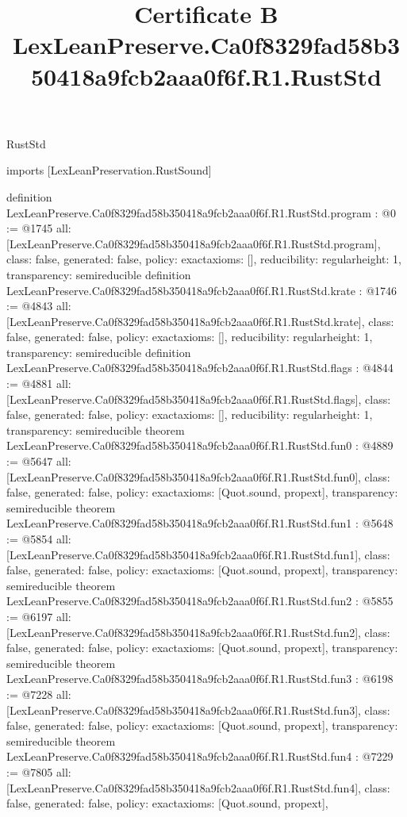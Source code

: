 \begin{lexlean}{RustStd}
\title{Certificate B LexLeanPreserve.Ca0f8329fad58b350418a9fcb2aaa0f6f.R1.RustStd}
\begin{coremodule}
imports [LexLeanPreservation.RustSound]

definition LexLeanPreserve.Ca0f8329fad58b350418a9fcb2aaa0f6f.R1.RustStd.program : @0 := @1745 {
  all: [LexLeanPreserve.Ca0f8329fad58b350418a9fcb2aaa0f6f.R1.RustStd.program],
  class: false,
  generated: false,
  policy: exact{axioms: []},
  reducibility: regular{height: 1},
  transparency: semireducible
}
definition LexLeanPreserve.Ca0f8329fad58b350418a9fcb2aaa0f6f.R1.RustStd.krate : @1746 := @4843 {
  all: [LexLeanPreserve.Ca0f8329fad58b350418a9fcb2aaa0f6f.R1.RustStd.krate],
  class: false,
  generated: false,
  policy: exact{axioms: []},
  reducibility: regular{height: 1},
  transparency: semireducible
}
definition LexLeanPreserve.Ca0f8329fad58b350418a9fcb2aaa0f6f.R1.RustStd.flags : @4844 := @4881 {
  all: [LexLeanPreserve.Ca0f8329fad58b350418a9fcb2aaa0f6f.R1.RustStd.flags],
  class: false,
  generated: false,
  policy: exact{axioms: []},
  reducibility: regular{height: 1},
  transparency: semireducible
}
theorem LexLeanPreserve.Ca0f8329fad58b350418a9fcb2aaa0f6f.R1.RustStd.fun0 : @4889 := @5647 {
  all: [LexLeanPreserve.Ca0f8329fad58b350418a9fcb2aaa0f6f.R1.RustStd.fun0],
  class: false,
  generated: false,
  policy: exact{axioms: [Quot.sound, propext]},
  transparency: semireducible
}
theorem LexLeanPreserve.Ca0f8329fad58b350418a9fcb2aaa0f6f.R1.RustStd.fun1 : @5648 := @5854 {
  all: [LexLeanPreserve.Ca0f8329fad58b350418a9fcb2aaa0f6f.R1.RustStd.fun1],
  class: false,
  generated: false,
  policy: exact{axioms: [Quot.sound, propext]},
  transparency: semireducible
}
theorem LexLeanPreserve.Ca0f8329fad58b350418a9fcb2aaa0f6f.R1.RustStd.fun2 : @5855 := @6197 {
  all: [LexLeanPreserve.Ca0f8329fad58b350418a9fcb2aaa0f6f.R1.RustStd.fun2],
  class: false,
  generated: false,
  policy: exact{axioms: [Quot.sound, propext]},
  transparency: semireducible
}
theorem LexLeanPreserve.Ca0f8329fad58b350418a9fcb2aaa0f6f.R1.RustStd.fun3 : @6198 := @7228 {
  all: [LexLeanPreserve.Ca0f8329fad58b350418a9fcb2aaa0f6f.R1.RustStd.fun3],
  class: false,
  generated: false,
  policy: exact{axioms: [Quot.sound, propext]},
  transparency: semireducible
}
theorem LexLeanPreserve.Ca0f8329fad58b350418a9fcb2aaa0f6f.R1.RustStd.fun4 : @7229 := @7805 {
  all: [LexLeanPreserve.Ca0f8329fad58b350418a9fcb2aaa0f6f.R1.RustStd.fun4],
  class: false,
  generated: false,
  policy: exact{axioms: [Quot.sound, propext]},
}
\end{coremodule}
\end{lexlean}
